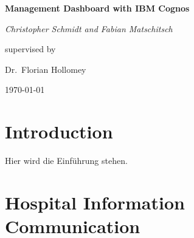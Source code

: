 \documentclass[a4paper]{article}
\begin{document}
	\begin{titlepage}
	
	\centering
	
	{\huge\bfseries Management Dashboard with IBM Cognos\par}
	\vspace{2cm}
	
	
	\begin{figure}
    \hspace{5cm}
	\end{figure}
	\vspace{1.5cm}
	
	{\Large\itshape Christopher Schmidt and Fabian Matschitsch\par}
	\vfill
	supervised by\par
	Dr.~Florian Hollomey
	\vfill
	{\large \today\par}	
	
	\end{titlepage}

	\tableofcontents
	\newpage

	\section{Introduction}
	Hier wird die Einführung stehen.
	\newpage
	
	\section{Hospital Information Communication}
\end{document}
